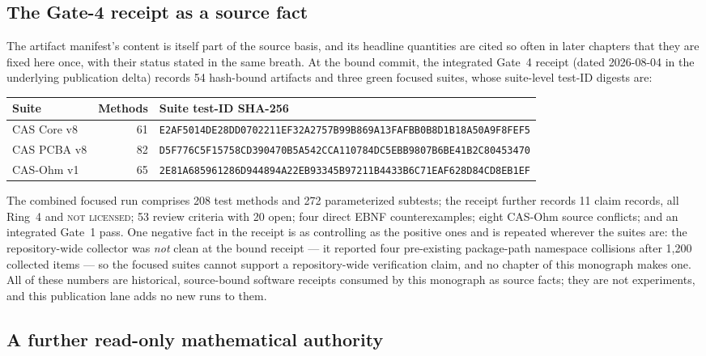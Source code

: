 \subsection{The Gate-4 receipt as a source fact}\label{ch03:artifacts:receipt}

The artifact manifest's content is itself part of the source basis, and
its headline quantities are cited so often in later chapters that they
are fixed here once, with their status stated in the same breath. At the
bound commit, the integrated Gate~4 receipt (dated 2026-08-04 in the
underlying publication delta) records 54 hash-bound artifacts and three
green focused suites, whose suite-level test-ID digests are:

\begin{center}
\small
\begin{tabular}{@{}lrl@{}}
\toprule
Suite & Methods & Suite test-ID SHA-256 \\
\midrule
CAS Core v8 & 61 & \texttt{E2AF5014DE28DD0702211EF32A2757B99B869A13FAFBB0B8D1B18A50A9F8FEF5} \\
CAS PCBA v8 & 82 & \texttt{D5F776C5F15758CD390470B5A542CCA110784DC5EBB9807B6BE41B2C80453470} \\
CAS-Ohm v1 & 65 & \texttt{2E81A685961286D944894A22EB93345B97211B4433B6C71EAF628D84CD8EB1EF} \\
\bottomrule
\end{tabular}
\end{center}

The combined focused run comprises 208 test methods and 272
parameterized subtests; the receipt further records 11 claim records,
all Ring~4 and \textsc{not licensed}; 53 review criteria with 20 open;
four direct EBNF counterexamples; eight CAS-Ohm source conflicts; and an
integrated Gate~1 pass. One negative fact in the receipt is as
controlling as the positive ones and is repeated wherever the suites
are: the repository-wide collector was \emph{not} clean at the bound
receipt --- it reported four pre-existing package-path namespace
collisions after 1{,}200 collected items --- so the focused suites
cannot support a repository-wide verification claim, and no chapter of
this monograph makes one. All of these numbers are historical,
source-bound software receipts consumed by this monograph as source
facts; they are not experiments, and this publication lane adds no new
runs to them.

\subsection{A further read-only mathematical authority}\label{ch03:artifacts:paper3}

